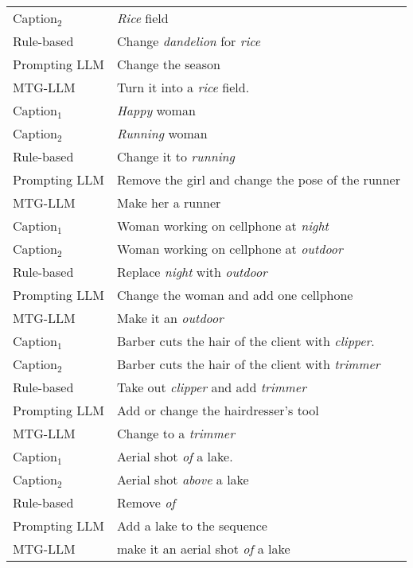 \begin{table}
\begin{tabular}{ll}
    Caption$_2$ & \textit{Rice} field  \\
    Rule-based & Change \textit{dandelion} for \textit{rice} \\
    Prompting LLM & Change the season \\
    MTG-LLM & Turn it into a \textit{rice} field. \\
    \midrule
    Caption$_1$ & \textit{Happy} woman \\
    Caption$_2$ & \textit{Running} woman \\
    Rule-based & Change it to \textit{running} \\
    Prompting LLM & Remove the girl and change the pose of the runner \\
    MTG-LLM & Make her a runner \\
    \midrule
    Caption$_1$ & Woman working on cellphone at \textit{night}  \\
    Caption$_2$ & Woman working on cellphone at \textit{outdoor} \\
    Rule-based & Replace \textit{night} with \textit{outdoor} \\
    Prompting LLM & Change the woman and add one cellphone \\
    MTG-LLM & Make it an \textit{outdoor} \\
    \midrule
    Caption$_1$ & Barber cuts the hair of the client with \textit{clipper}. \\
    Caption$_2$ & Barber cuts the hair of the client with \textit{trimmer} \\
    Rule-based & Take out \textit{clipper} and add \textit{trimmer} \\
    Prompting LLM & Add or change the hairdresser's tool \\
    MTG-LLM & Change to a \textit{trimmer} \\
    \midrule
    Caption$_1$ & Aerial shot \textit{of} a lake. \\
    Caption$_2$ & Aerial shot \textit{above} a lake  \\
    Rule-based & Remove \textit{of} \\
    Prompting LLM & Add a lake to the sequence \\
    MTG-LLM & make it an aerial shot \textit{of} a lake \\
    \bottomrule
\end{tabular}
\end{table}


 
